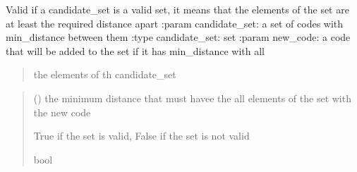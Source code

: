 \documentclass[letterpaper,10pt,english]{sphinxmanual}
\begin{document}
\begin{fulllineitems}
\label{\detokenize{index:hammindist.functions.is_valid_set}}
\pysigstartsignatures
\pysiglinewithargsret
{}
{\sphinxparamcomma {}\sphinxparamcomma {}}
{}
\pysigstopsignatures
\sphinxAtStartPar
Valid if a candidate\_set is a valid set, it means that the elements of the set
are at least the required distance apart
:param candidate\_set: a set of codes with min\_distance between them
:type candidate\_set: set
:param new\_code: a code that will be added to the set if it has min\_distance with all
\begin{quote}

\sphinxAtStartPar
the elements of th candidate\_set
\end{quote}
\begin{quote}\begin{description}
\sphinxAtStartPar
{} () \textendash{} the minimum distance that must havee the all elements of the set
with the new code

\sphinxAtStartPar
True if the set is valid, False if the set is not valid

\sphinxAtStartPar
bool

\end{description}\end{quote}

\end{fulllineitems}

\end{document}
